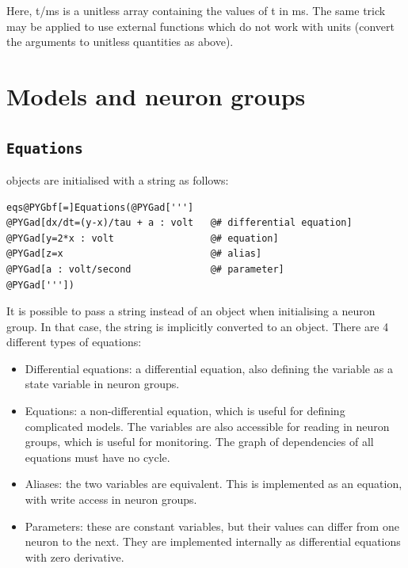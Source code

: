 \documentclass[letterpaper,10pt,english]{manual}
\begin{document}
Here, t/ms is a unitless array containing the values of t in ms.
The same trick may be applied to use external functions which do not work with units
(convert the arguments to unitless quantities as above).

\resetcurrentobjects
\hypertarget{--doc-models}{}

\section{Models and neuron groups}


\subsection{\texttt{Equations}}

\hyperlink{brian.Equations}{} objects are initialised with a string as follows:

\begin{Verbatim}[commandchars=@\[\]]
eqs@PYGbf[=]Equations(@PYGad[''']
@PYGad[dx/dt=(y-x)/tau + a : volt   @# differential equation]
@PYGad[y=2*x : volt                 @# equation]
@PYGad[z=x                          @# alias]
@PYGad[a : volt/second              @# parameter]
@PYGad['''])
\end{Verbatim}
It is possible to pass a string instead of an \hyperlink{brian.Equations}{} object when initialising
a neuron group. In that case, the string is implicitly converted to an \hyperlink{brian.Equations}{} object.
There are 4 different types of equations:
\begin{itemize}
\item {} 
Differential equations: a differential equation, also defining the variable as a state
variable in neuron groups.

\item {} 
Equations: a non-differential equation, which is useful for defining complicated models.
The variables are also accessible for reading in neuron groups, which is useful for
monitoring. The graph of dependencies of all equations must have no cycle.

\item {} 
Aliases: the two variables are equivalent. This is implemented as an equation,
with write access in neuron groups.

\item {} 
Parameters: these are constant variables, but their values can differ from one neuron
to the next. They are implemented internally as differential equations with zero
derivative.

\end{itemize}
\end{document}
